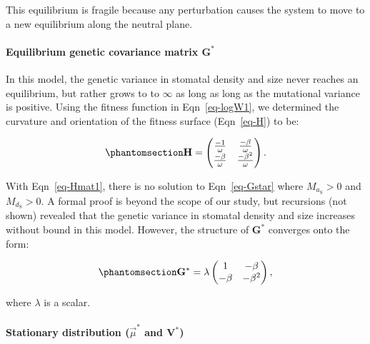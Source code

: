 \documentclass[
  letterpaper,
  DIV=11,
  numbers=noendperiod]{scrartcl}
\let\oldparagraph\paragraph
\renewcommand{\paragraph}[1]{\oldparagraph{#1}\mbox{}}
\begin{document}
This equilibrium is fragile because any perturbation causes the system
to move to a new equilibrium along the neutral plane.

\paragraph{\texorpdfstring{Equilibrium genetic covariance matrix
\(\mathbf{G}^*\)}{Equilibrium genetic covariance matrix \textbackslash mathbf\{G\}\^{}*}}\label{equilibrium-genetic-covariance-matrix-mathbfg}

In this model, the genetic variance in stomatal density and size never
reaches an equilibrium, but rather grows to to \(\infty\) as long as
long as the mutational variance is positive. Using the fitness function
in Eqn~\ref{eq-logW1}, we determined the curvature and orientation of
the fitness surface (Eqn~\ref{eq-H}) to be:

\begin{equation}\phantomsection\label{eq-Hmat1}{\mathbf{H} = \begin{pmatrix} \frac{-1}{\omega} & \frac{-\beta}{\omega} \\ \frac{-\beta}{\omega} & \frac{-\beta^2}{\omega}  \end{pmatrix}.}\end{equation}

With Eqn~\ref{eq-Hmat1}, there is no solution to Eqn~\ref{eq-Gstar}
where \(M_{a_\mathrm{S}} > 0\) and \(M_{d_\mathrm{S}} > 0\). A formal
proof is beyond the scope of our study, but recursions (not shown)
revealed that the genetic variance in stomatal density and size
increases without bound in this model. However, the structure of
\(\mathbf{G}^*\) converges onto the form:

\begin{equation}\phantomsection\label{eq-Gstar1}{\mathbf{G}^* = \lambda \begin{pmatrix} 1 & -\beta \\ -\beta & -\beta^2 \end{pmatrix},}\end{equation}

where \(\lambda\) is a scalar.

\paragraph{\texorpdfstring{Stationary distribution (\(\vec{\mu}^*\) and
\(\mathbf{V}^*\))}{Stationary distribution (\textbackslash vec\{\textbackslash mu\}\^{}* and \textbackslash mathbf\{V\}\^{}*)}}\label{stationary-distribution-vecmu-and-mathbfv}
\end{document}
